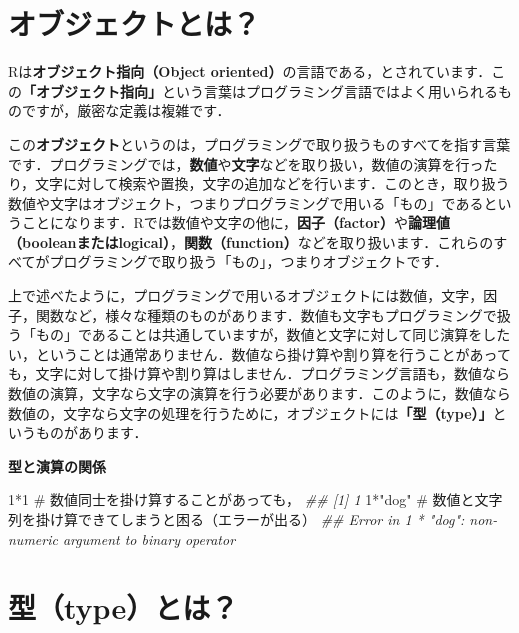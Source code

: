\documentclass[
  letterpaper,
  DIV=11,
  numbers=noendperiod]{scrreprt}
\newenvironment{Shaded}{\begin{snugshade}}{\end{snugshade}}
\newcommand{\CommentTok}[1]{\textcolor[rgb]{0.37,0.37,0.37}{#1}}
\newcommand{\DecValTok}[1]{\textcolor[rgb]{0.68,0.00,0.00}{#1}}
\newcommand{\DocumentationTok}[1]{\textcolor[rgb]{0.37,0.37,0.37}{\textit{#1}}}
\newcommand{\SpecialCharTok}[1]{\textcolor[rgb]{0.37,0.37,0.37}{#1}}
\newcommand{\StringTok}[1]{\textcolor[rgb]{0.13,0.47,0.30}{#1}}
\begin{document}
\hypertarget{ux30aaux30d6ux30b8ux30a7ux30afux30c8ux3068ux306f}{%
\section{オブジェクトとは？}\label{ux30aaux30d6ux30b8ux30a7ux30afux30c8ux3068ux306f}}

Rは\textbf{オブジェクト指向（Object
oriented）}の言語である，とされています．この\textbf{「オブジェクト指向」}という言葉はプログラミング言語ではよく用いられるものですが，厳密な定義は複雑です．

この\textbf{オブジェクト}というのは，プログラミングで取り扱うものすべてを指す言葉です．プログラミングでは，\textbf{数値}や\textbf{文字}などを取り扱い，数値の演算を行ったり，文字に対して検索や置換，文字の追加などを行います．このとき，取り扱う数値や文字はオブジェクト，つまりプログラミングで用いる「もの」であるということになります．Rでは数値や文字の他に，\textbf{因子（factor）}や\textbf{論理値（booleanまたはlogical）}，\textbf{関数（function）}などを取り扱います．これらのすべてがプログラミングで取り扱う「もの」，つまりオブジェクトです．

上で述べたように，プログラミングで用いるオブジェクトには数値，文字，因子，関数など，様々な種類のものがあります．数値も文字もプログラミングで扱う「もの」であることは共通していますが，数値と文字に対して同じ演算をしたい，ということは通常ありません．数値なら掛け算や割り算を行うことがあっても，文字に対して掛け算や割り算はしません．プログラミング言語も，数値なら数値の演算，文字なら文字の演算を行う必要があります．このように，数値なら数値の，文字なら文字の処理を行うために，オブジェクトには\textbf{「型（type）」}というものがあります．

\textbf{型と演算の関係}

\begin{Shaded}
\begin{Highlighting}[]
\DecValTok{1}\SpecialCharTok{*}\DecValTok{1} \CommentTok{\# 数値同士を掛け算することがあっても，}
\DocumentationTok{\#\# [1] 1}
\DecValTok{1}\SpecialCharTok{*}\StringTok{"dog"} \CommentTok{\# 数値と文字列を掛け算できてしまうと困る（エラーが出る）}
\DocumentationTok{\#\# Error in 1 * "dog": non{-}numeric argument to binary operator}
\end{Highlighting}
\end{Shaded}

\hypertarget{ux578btypeux3068ux306f}{%
\section{型（type）とは？}\label{ux578btypeux3068ux306f}}
\end{document}
